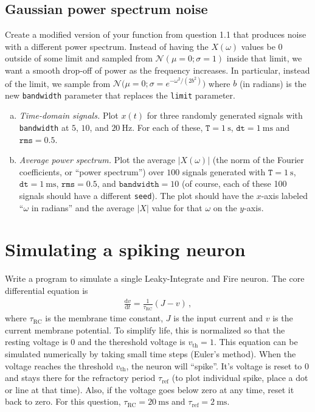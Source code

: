 	\subsection{Gaussian power spectrum noise}

	Create a modified version of your function from question 1.1 that produces noise with a different power spectrum. Instead of having the $X(\omega)$ values be $0$ outside of some limit and sampled from $\mathcal{N}(\mu=0; \sigma=1)$ inside that limit, we want a smooth drop-off of power as the frequency increases. In particular, instead of the limit, we sample from $\mathcal{N}\big(\mu=0; \sigma=e^{-{\omega^2/(2b^2)}}\big)$ where $b$ (in radians) is the new \texttt{bandwidth} parameter that replaces the \texttt{limit} parameter.

	\begin{enumerate}[a)]
		\item {} \textit{Time-domain signals.} Plot $x(t)$ for three randomly generated signals with \texttt{bandwidth} at $5$, $10$, and $\SI{20}{\hertz}$. For each of these, $\mathtt{T}=\SI{1}{\second}$, $\mathtt{dt}=\SI{1}{\milli\second}$ and $\mathtt{rms}=0.5$.
		\item {} \textit{Average power spectrum.} Plot the average $|X(\omega)|$ (the norm of the Fourier coefficients, or \enquote{power spectrum}) over $100$ signals generated with $\mathtt{T}=\SI{1}{\second}$, $\mathtt{dt}=\SI{1}{\milli\second}$, $\mathtt{rms}=0.5$, and $\mathtt{bandwidth}=10$ (of course, each of these 100 signals should have a different \texttt{seed}). The plot should have the $x$-axis labeled \enquote{$\omega$ in radians} and the average $|X|$ value for that $\omega$ on the $y$-axis.
	\end{enumerate}

	\section{Simulating a spiking neuron}

	Write a program to simulate a single Leaky-Integrate and Fire neuron. The core differential equation is
	\begin{align*}
		\frac{\mathrm{d}v}{\mathrm{d}t} = \frac{1}{\tau_\mathrm{RC}} (J - v) \,,
	\end{align*}
	where $\tau_\mathrm{RC}$ is the membrane time constant, $J$ is the input current and $v$ is the current membrane potential. To simplify life, this is normalized so that the resting voltage is $0$ and the thereshold voltage is $v_\mathrm{th} = 1$. This equation can be simulated numerically by taking small time steps (Euler's method). When the voltage reaches the threshold $v_\mathrm{th}$, the neuron will \enquote{spike}. It's voltage is reset to $0$ and stays there for the refractory period $\tau_\mathrm{ref}$ (to plot individual spike, place a dot or line at that time). Also, if the voltage goes below zero at any time, reset it back to zero. For this question, $\tau_\mathrm{RC}=\SI{20}{\milli\second}$ and $\tau_\mathrm{ref}=\SI{2}{\milli\second}$.

